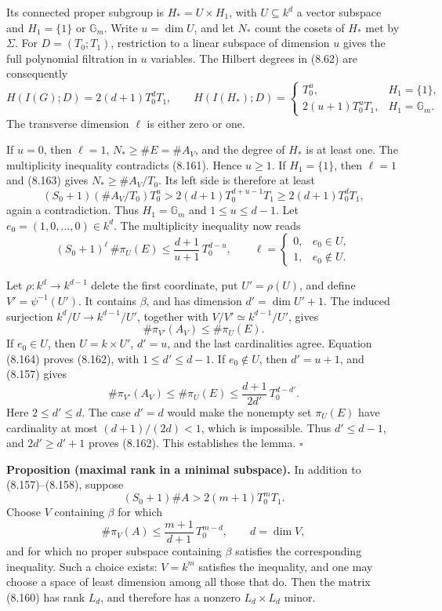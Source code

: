 \documentclass[
  11pt,
  a4paper,
]{article}
\begin{document}
Its connected proper subgroup is \(H_*=U\times H_1\), with
\(U\subseteq k^d\) a vector subspace and \(H_1=\{1\}\) or
\(\mathbb G_m\). Write \(u=\dim U\), and let \(N_*\) count the cosets of
\(H_*\) met by \(\Sigma\). For \(D=(T_0;T_1)\), restriction to a linear
subspace of dimension \(u\) gives the full polynomial filtration in
\(u\) variables. The Hilbert degrees in (8.62) are consequently \[
H(I(G);D)=2(d+1)T_0^dT_1,\qquad
H(I(H_*);D)=
\begin{cases}
T_0^u,&H_1=\{1\},\\
2(u+1)T_0^uT_1,&H_1=\mathbb G_m.
\end{cases}
\] The transverse dimension \(\ell\) is either zero or one.

If \(u=0\), then \(\ell=1\), \(N_*\ge\#E=\#A_V\), and the degree of
\(H_*\) is at least one. The multiplicity inequality contradicts
(8.161). Hence \(u\ge1\). If \(H_1=\{1\}\), then \(\ell=1\) and (8.163)
gives \(N_*\ge\#A_V/T_0\). Its left side is therefore at least \[
(S_0+1)(\#A_V/T_0)T_0^u
>2(d+1)T_0^{d+u-1}T_1
\ge2(d+1)T_0^dT_1,
\] again a contradiction. Thus \(H_1=\mathbb G_m\) and
\(1\le u\le d-1\). Let \(e_0=(1,0,\ldots,0)\in k^d\). The multiplicity
inequality now reads \[
(S_0+1)^\ell\,\#\pi_U(E)
\le\frac{d+1}{u+1}\,T_0^{d-u},
\qquad
\ell=
\begin{cases}0,&e_0\in U,\\1,&e_0\notin U.\end{cases}
\tag{8.164}
\]

Let \(\rho:k^d\to k^{d-1}\) delete the first coordinate, put
\(U'=\rho(U)\), and define \(V'=\psi^{-1}(U')\). It contains \(\beta\),
and has dimension \(d'=\dim U'+1\). The induced surjection
\(k^d/U\to k^{d-1}/U'\), together with \(V/V'\simeq k^{d-1}/U'\), gives
\[
\#\pi_{V'}(A_V)\le\#\pi_U(E).
\] If \(e_0\in U\), then \(U=k\times U'\), \(d'=u\), and the last
cardinalities agree. Equation (8.164) proves (8.162), with
\(1\le d'\le d-1\). If \(e_0\notin U\), then \(d'=u+1\), and (8.157)
gives \[
\#\pi_{V'}(A_V)\le\#\pi_U(E)
\le\frac{d+1}{2d'}\,T_0^{d-d'}.
\] Here \(2\le d'\le d\). The case \(d'=d\) would make the nonempty set
\(\pi_U(E)\) have cardinality at most \((d+1)/(2d)<1\), which is
impossible. Thus \(d'\le d-1\), and \(2d'\ge d'+1\) proves (8.162). This
establishes the lemma. \(\square\)

\textbf{Proposition (maximal rank in a minimal subspace).} In addition
to (8.157)--(8.158), suppose \[
(S_0+1)\#A>2(m+1)T_0^mT_1.
\] Choose \(V\) containing \(\beta\) for which \[
\#\pi_V(A)\le\frac{m+1}{d+1}\,T_0^{m-d},
\qquad d=\dim V,
\] and for which no proper subspace containing \(\beta\) satisfies the
corresponding inequality. Such a choice exists: \(V=k^m\) satisfies the
inequality, and one may choose a space of least dimension among all
those that do. Then the matrix (8.160) has rank \(L_d\), and therefore
has a nonzero \(L_d\times L_d\) minor.
\end{document}
